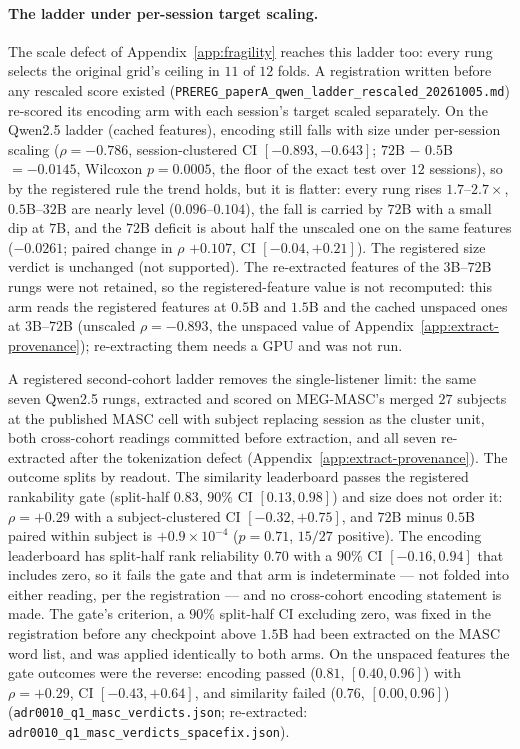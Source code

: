 \documentclass{article}
\begin{document}
\paragraph{The ladder under per-session target scaling.} The scale defect of
Appendix~\ref{app:fragility} reaches this ladder too: every rung selects the original grid's ceiling in
$11$ of $12$ folds. A registration written before any rescaled score existed
(\texttt{PREREG\_paperA\_qwen\_ladder\_rescaled\_20261005.md}) re-scored its encoding arm with each
session's target scaled separately. On the Qwen2.5 ladder (cached features), encoding still falls with
size under per-session scaling ($\rho = -0.786$, session-clustered CI $[-0.893, -0.643]$;
$72$B $-$ $0.5$B $= -0.0145$, Wilcoxon $p = 0.0005$, the floor of the exact test over $12$
sessions), so by the registered rule the trend holds, but it is flatter: every rung rises
$1.7$--$2.7\times$, $0.5$B--$32$B are nearly level ($0.096$--$0.104$), the fall is carried by
$72$B with a small dip at $7$B, and the $72$B deficit is about half the unscaled one on the same
features ($-0.0261$; paired change in $\rho$ $+0.107$, CI $[-0.04, +0.21]$). The registered size
verdict is unchanged (not supported). The re-extracted features of the $3$B--$72$B rungs were not
retained, so the registered-feature value is not recomputed: this arm reads the registered features at
$0.5$B and $1.5$B and the cached unspaced ones at $3$B--$72$B (unscaled $\rho = -0.893$, the
unspaced value of Appendix~\ref{app:extract-provenance}); re-extracting them needs a GPU and was not run.

A registered second-cohort ladder removes the single-listener limit: the same seven Qwen2.5 rungs,
extracted and scored on MEG-MASC's merged $27$ subjects at the published MASC cell with subject
replacing session as the cluster unit, both cross-cohort readings committed before extraction, and
all seven re-extracted after the tokenization defect (Appendix~\ref{app:extract-provenance}). The
outcome splits by readout. The similarity leaderboard passes the registered rankability gate
(split-half $0.83$, $90\%$ CI $[0.13, 0.98]$) and size does not order it: $\rho = +0.29$ with a
subject-clustered CI $[-0.32, +0.75]$, and $72$B minus $0.5$B paired within subject is
$+0.9\times10^{-4}$ ($p = 0.71$, $15/27$ positive). The encoding leaderboard has split-half rank
reliability $0.70$ with a $90\%$ CI $[-0.16, 0.94]$ that includes zero, so it fails the gate and that
arm is indeterminate --- not folded into either reading, per the registration --- and no
cross-cohort encoding statement is made. The gate's criterion, a $90\%$ split-half CI excluding
zero, was fixed in the registration before any checkpoint above $1.5$B had been extracted on the
MASC word list, and was applied identically to both arms. On the unspaced features the gate
outcomes were the reverse: encoding passed ($0.81$, $[0.40, 0.96]$) with $\rho = +0.29$, CI
$[-0.43, +0.64]$, and similarity failed ($0.76$, $[0.00, 0.96]$)
(\texttt{adr0010\_q1\_masc\_verdicts.json}; re-extracted:
\texttt{adr0010\_q1\_masc\_verdicts\_spacefix.json}).
\end{document}
